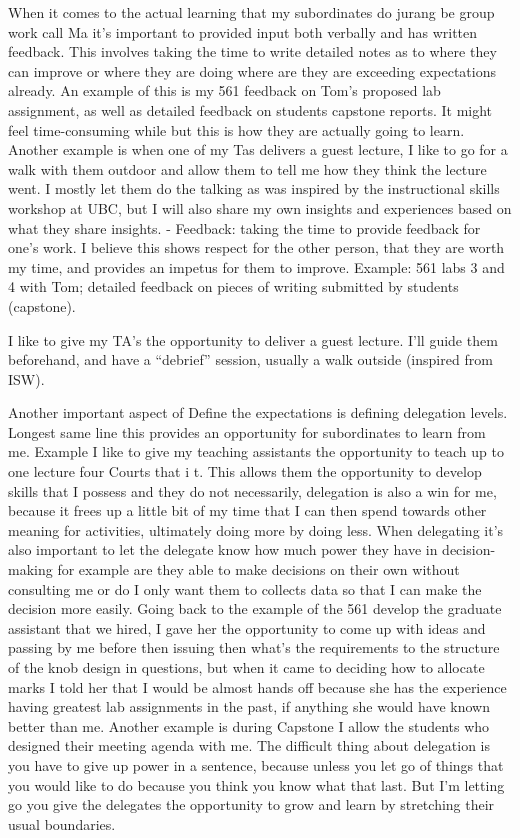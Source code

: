 \documentclass[]{article}
\begin{document}
When it comes to the actual learning that my subordinates do jurang be group work call Ma it's important to provided input both verbally and has written feedback. This involves taking the time to write detailed notes as to where they can improve or where they are doing where are they are exceeding expectations already. An example of this is my 561 feedback on Tom's proposed lab assignment, as well as detailed feedback on students capstone reports. It might feel time-consuming while but this is how they are actually going to learn. Another example is when one of my Tas delivers a guest lecture, I like to go for a walk with them outdoor and allow them to tell me how they think the lecture went. I mostly let them do the talking as was inspired by the instructional skills workshop at UBC, but I will also share my own insights and experiences based on what they share insights. - Feedback: taking the time to provide feedback for one's work. I believe this shows respect for the other person, that they are worth my time, and provides an impetus for them to improve. Example: 561 labs 3 and 4 with Tom; detailed feedback on pieces of writing submitted by students (capstone).

I like to give my TA's the opportunity to deliver a guest lecture. I'll guide them beforehand, and have a ``debrief'' session, usually a walk outside (inspired from ISW).

Another important aspect of Define the expectations is defining delegation levels. Longest same line this provides an opportunity for subordinates to learn from me. Example I like to give my teaching assistants the opportunity to teach up to one lecture four Courts that i t. This allows them the opportunity to develop skills that I possess and they do not necessarily, delegation is also a win for me, because it frees up a little bit of my time that I can then spend towards other meaning for activities, ultimately doing more by doing less. When delegating it's also important to let the delegate know how much power they have in decision-making for example are they able to make decisions on their own without consulting me or do I only want them to collects data so that I can make the decision more easily. Going back to the example of the 561 develop the graduate assistant that we hired, I gave her the opportunity to come up with ideas and passing by me before then issuing then what's the requirements to the structure of the knob design in questions, but when it came to deciding how to allocate marks I told her that I would be almost hands off because she has the experience having greatest lab assignments in the past, if anything she would have known better than me. Another example is during Capstone I allow the students who designed their meeting agenda with me. The difficult thing about delegation is you have to give up power in a sentence, because unless you let go of things that you would like to do because you think you know what that last. But I'm letting go you give the delegates the opportunity to grow and learn by stretching their usual boundaries.
\end{document}
